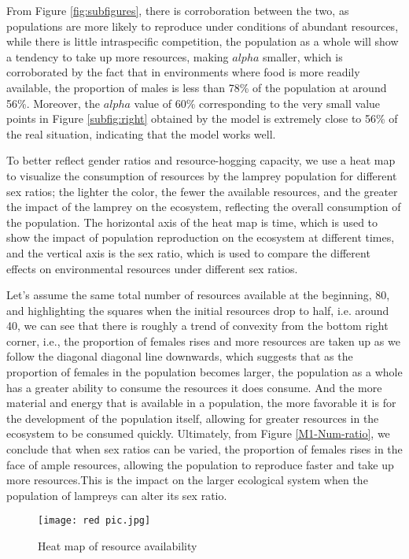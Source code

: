 \documentclass[12pt]{article}  %
\begin{document}
From Figure \ref{fig:subfigures}, there is corroboration between the two, as populations are more likely to reproduce under conditions of abundant resources, while there is little intraspecific competition, the population as a whole will show a tendency to take up more resources, making $alpha$ smaller, which is corroborated by the fact that in environments where food is more readily available, the proportion of males is less than 78\% of the population at around 56\%. Moreover, the $alpha$ value of 60\% corresponding to the very small value points in Figure \ref{subfig:right} obtained by the model is extremely close to 56\% of the real situation, indicating that the model works well.

To better reflect gender ratios and resource-hogging capacity, we use a heat map to visualize the consumption of resources by the lamprey population for different sex ratios; the lighter the color, the fewer the available resources, and the greater the impact of the lamprey on the ecosystem, reflecting the overall consumption of the population. The horizontal axis of the heat map is time, which is used to show the impact of population reproduction on the ecosystem at different times, and the vertical axis is the sex ratio, which is used to compare the different effects on environmental resources under different sex ratios.

Let's assume the same total number of resources available at the beginning, 80, and highlighting the squares when the initial resources drop to half, i.e. around 40, we can see that there is roughly a trend of convexity from the bottom right corner, i.e., the proportion of females rises and more resources are taken up as we follow the diagonal diagonal line downwards, which suggests that as the proportion of females in the population becomes larger, the population as a whole has a greater ability to consume the resources it does consume. And the more material and energy that is available in a population, the more favorable it is for the development of the population itself, allowing for greater resources in the ecosystem to be consumed quickly.
\clearpage
Ultimately, from Figure \ref{M1-Num-ratio}, we conclude that when sex ratios can be varied, the proportion of females rises in the face of ample resources, allowing the population to reproduce faster and take up more resources.This is the impact on the larger ecological system when the population of lampreys can alter its sex ratio.

\begin{figure}[htbp]
	\centering
	\texttt{[image: red pic.jpg]}
	\caption{Heat map of resource availability}\label{red}
\end{figure}
\end{document}
